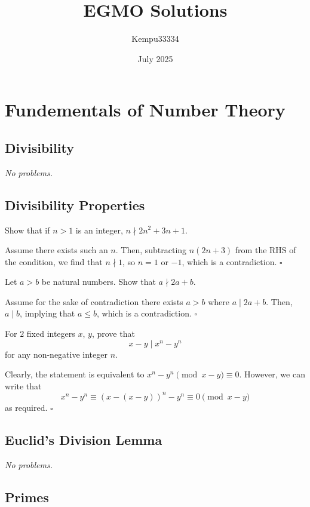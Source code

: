 \documentclass{article}
\title{EGMO Solutions}
\author{Kempu33334}
\date{July 2025}
\newcommand{\noproblems}{\emph{No problems.}}
\begin{document}
\maketitle

\tableofcontents

\newpage

\section{Fundementals of Number Theory}

\subsection{Divisibility}

\noproblems

\subsection{Divisibility Properties}

\begin{problem}[1.2.1]{}
Show that if $n > 1$ is an integer, $n \nmid 2n^2 + 3n + 1$.
\end{problem}
Assume there exists such an $n$. Then, subtracting $n(2n+3)$ from the RHS of the condition, we find that $n \nmid 1$, so $n = 1$ or $-1$, which is a contradiction. $\square$

\begin{problem}[1.2.2]{}
Let $a > b$ be natural numbers. Show that $a \nmid 2a + b$.
\end{problem}
Assume for the sake of contradiction there exists $a > b$ where $a \mid 2a+b$. Then, $a \mid b$, implying that $a \le b$, which is a contradiction. $\square$

\begin{problem}[1.2.3]{}
For $2$ fixed integers $x$, $y$, prove that \[x-y \mid x^n-y^n\] for any non-negative integer $n$.
\end{problem}
Clearly, the statement is equivalent to $x^n-y^n \pmod{x-y} \equiv 0$. However, we can write that \[x^n-y^n \equiv (x-(x-y))^n-y^n \equiv 0 \pmod{x-y}\] as required. $\square$

\subsection{Euclid's Division Lemma}

\noproblems

\subsection{Primes}
\end{document}
